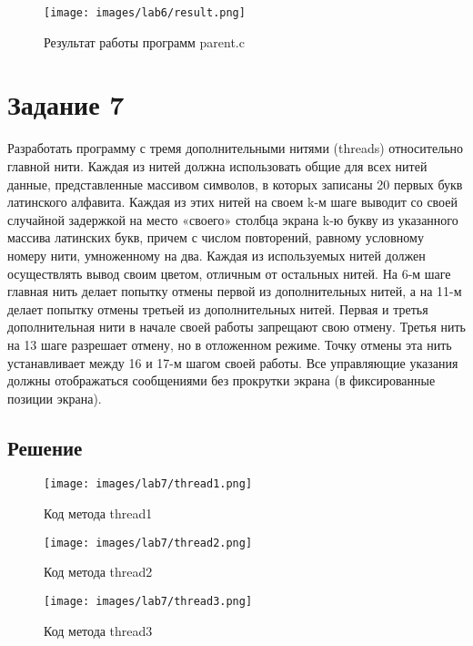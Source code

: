 \documentclass[14pt, a4paper]{article}
\begin{document}
    \begin{figure}[H]
        \centering
        \texttt{[image: images/lab6/result.png]}
        \caption{Результат работы программ parent.c}
    \end{figure}

    \newpage

    \section*{Задание 7}

    Разработать программу с тремя дополнительными нитями (threads) относительно главной нити. Каждая из нитей должна использовать общие для всех нитей данные, представленные массивом символов, в которых записаны 20 первых букв латинского алфавита. Каждая из этих нитей на своем k-м шаге выводит со своей случайной задержкой на место «своего» столбца экрана k-ю букву из указанного массива латинских букв, причем с числом повторений, равному условному номеру нити, умноженному на два. Каждая из используемых нитей должен осуществлять вывод своим цветом, отличным от остальных нитей. На 6-м шаге главная нить делает попытку отмены первой из дополнительных нитей, а на 11-м делает попытку отмены третьей из дополнительных нитей. Первая и третья дополнительная нити в начале своей работы запрещают свою отмену. Третья нить на 13 шаге разрешает отмену, но в отложенном режиме. Точку отмены эта нить устанавливает между 16 и 17-м шагом своей работы. Все управляющие указания должны отображаться сообщениями без прокрутки экрана (в фиксированные позиции экрана).

    \subsection*{Решение}

    \begin{figure}[H]
        \centering
        \texttt{[image: images/lab7/thread1.png]}
        \caption{Код метода thread1}
    \end{figure}

    \begin{figure}[H]
        \centering
        \texttt{[image: images/lab7/thread2.png]}
        \caption{Код метода thread2}
    \end{figure}

    \begin{figure}[H]
        \centering
        \texttt{[image: images/lab7/thread3.png]}
        \caption{Код метода thread3}
    \end{figure}
\end{document}

